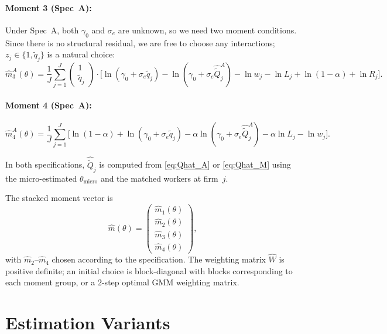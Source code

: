 \documentclass[11pt]{article}
\begin{document}
\paragraph{Moment 3 (Spec~A):} Under Spec~A, both $\gamma_0$ and $\sigma_e$ are unknown, so we need two moment conditions. Since there is no structural residual, we are free to choose any interactions; $z_j \in \{1, \tilde q_j\}$ is a natural choice:
\begin{equation}\label{eq:sm3_A}
\hat m_3^A(\theta) = \frac{1}{J}\sum_{j=1}^J \begin{pmatrix} 1 \\ \tilde q_j\end{pmatrix}\cdot\Big[\ln(\gamma_0+\sigma_e\tilde q_j) - \ln(\gamma_0+\sigma_e\hat{\tilde Q}_j^A) - \ln w_j - \ln L_j + \ln(1-\alpha) + \ln R_j\Big].
\end{equation}

\paragraph{Moment 4 (Spec~A):}
\begin{equation}\label{eq:sm4_A}
\hat m_4^A(\theta) = \frac{1}{J}\sum_{j=1}^J \Big[\ln(1-\alpha)+\ln(\gamma_0+\sigma_e\tilde q_j) - \alpha\ln(\gamma_0+\sigma_e\hat{\tilde Q}_j^A) - \alpha\ln L_j - \ln w_j\Big].
\end{equation}

\noindent In both specifications, $\hat{\tilde Q}_j$ is computed from \eqref{eq:Qhat_A} or \eqref{eq:Qhat_M} using the micro-estimated $\theta_{\text{micro}}$ and the matched workers at firm~$j$.

The stacked moment vector is
\begin{equation}\label{eq:mhat}
\hat m(\theta) = \begin{pmatrix} \hat m_1(\theta) \\ \hat m_2(\theta) \\ \hat m_3(\theta) \\ \hat m_4(\theta) \end{pmatrix},
\end{equation}
with $\hat m_2$--$\hat m_4$ chosen according to the specification. The weighting matrix $\hat W$ is positive definite; an initial choice is block-diagonal with blocks corresponding to each moment group, or a 2-step optimal GMM weighting matrix.


\section{Estimation Variants}\label{sec:variants}
\end{document}
